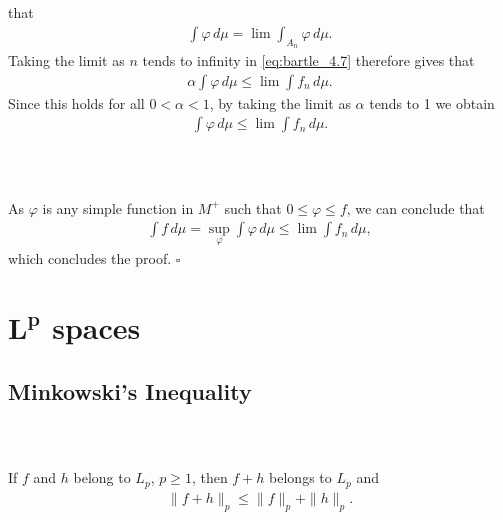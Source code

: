 \documentclass{beamer}
\numberwithin{equation}{section}
\begin{document}
\begin{frame}\frametitle{{\normalsize \secname} \\ {\large \subsecname}}
    that
    \begin{align}
        \int \varphi \, d\mu = \lim \int_{A_n} \varphi \, d\mu.
    \end{align}
    Taking the limit as $n$ tends to infinity in \eqref{eq:bartle_4.7} therefore gives that
    \begin{align}
        \alpha \int \varphi \, d\mu \leq \lim \int f_n \, d\mu.
    \end{align}
    Since this holds for all $0 < \alpha < 1$, by taking the limit as $\alpha$ tends to 1 we obtain
    \begin{align}
        \int \varphi \, d\mu \leq \lim \int f_n \, d\mu.
    \end{align}
\end{frame}

\begin{frame}\frametitle{{\normalsize \secname} \\ {\large \subsecname}}
    As $\varphi$ is any simple function in $M^+$ such that $0 \leq \varphi \leq f$, we can conclude that
    \begin{align}
        \int f \, d\mu = \sup_{\varphi} \int \varphi \, d\mu \leq \lim \int f_n \, d\mu,
    \end{align}
    which concludes the proof. \hfill $\square$
\end{frame}

\section{$\mathbf{L^p}$ spaces}

\subsection{Minkowski's Inequality}

\begin{frame}\frametitle{{\normalsize \secname} \\ {\large \subsecname}}
    \begin{theorem}
        If $f$ and $h$ belong to $L_p$, $p \geq 1$, then $f + h$ belongs to $L_p$ and
        \begin{align}\label{eq:b6.6}
            \| f + h \|_p \leq \| f \|_p + \| h \|_p.
        \end{align}
    \end{theorem}
\end{frame}
\end{document}
